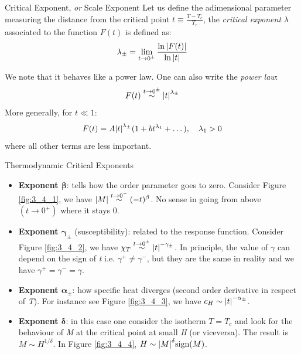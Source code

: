 \documentclass[../../Main/Main.tex]{subfiles}
\begin{document}
\begin{definition}{Critical Exponent, \emph{or} Scale Exponent}{}
Let us define the adimensional parameter measuring the distance from the critical point \( t \equiv \frac{T-T_c}{T_c} \), the \emph{critical exponent} \( \lambda  \) associated to the function \( F(t) \) is defined as:
\begin{equation}
  \lambda _{\pm} = \lim_{t \rightarrow 0^{\pm}} \frac{\ln{\abs{F(t)} } }{\ln{\abs{t} } }
\end{equation}
\end{definition}

We note that it behaves like a power law. One can also write the \textit{power law}:
\begin{equation}
  F(t) \overset{t \rightarrow  0^{\pm}}{\sim } \abs{t}^{\lambda _{\pm}}
\end{equation}
More generally, for \( t \ll 1 \):
\begin{equation}
  F(t) = A \abs{t}^{\lambda _{\pm}} ( 1 + bt^{\lambda _1}+ \dots), \quad \lambda _1 > 0
\end{equation}
where all other terms are less important.

\begin{definition}{Thermodynamic Critical Exponents}{}
\begin{itemize}
\item \textbf{Exponent \( \pmb{\beta} \)}: tells how the order parameter goes to zero.
Consider Figure \ref{fig:3_4_1}, we have \( \abs{M} \overset{t \rightarrow  0^-}{\sim} (-t)^{\beta }  \). No sense in going from above \( (t \rightarrow 0^+) \) where it stays 0.

\item \textbf{Exponent \(\pmb{ \gamma _{\pm} } \)} (susceptibility): related to the response function. Consider Figure \ref{fig:3_4_2}, we have \( \chi _T \overset{t \rightarrow 0^{\pm}}{\sim} \abs{t}^{-\gamma _{\pm} }   \). In principle, the value of \( \gamma   \) can depend on the sign of \emph{t} i.e.   \( \gamma ^+ \neq \gamma ^-  \), but they are the same in reality and we have \( \gamma ^+ = \gamma ^- = \gamma     \).

\item \textbf{Exponent \(\pmb{ \alpha _{\pm} }\)}: how specific heat diverges (second order derivative in respect of \emph{T}). For instance see Figure \ref{fig:3_4_3}, we have \( c_H \sim \abs{t}^{-\alpha _{\pm}}  \).

\item \textbf{Exponent \( \pmb{\delta   }\)}: in this case one consider the isotherm \( T =T_c \) and look for the behaviour of \emph{M} at the critical point at small \emph{H} (or viceversa).  The result is \( M \sim H^{1/\delta } \).
In Figure \ref{fig:3_4_4}, \( H \sim \abs{M}^{\delta } \text{sign} (M)  \).

\end{itemize}
\end{definition}
\end{document}

